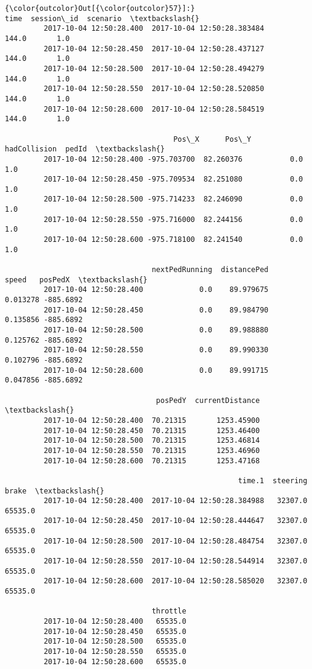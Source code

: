 \documentclass[11pt]{article}
\begin{document}
\begin{Verbatim}[commandchars=\\\{\}]
{\color{outcolor}Out[{\color{outcolor}57}]:}                                                time  session\_id  scenario  \textbackslash{}
         2017-10-04 12:50:28.400  2017-10-04 12:50:28.383484       144.0       1.0   
         2017-10-04 12:50:28.450  2017-10-04 12:50:28.437127       144.0       1.0   
         2017-10-04 12:50:28.500  2017-10-04 12:50:28.494279       144.0       1.0   
         2017-10-04 12:50:28.550  2017-10-04 12:50:28.520850       144.0       1.0   
         2017-10-04 12:50:28.600  2017-10-04 12:50:28.584519       144.0       1.0   
         
                                       Pos\_X      Pos\_Y  hadCollision  pedId  \textbackslash{}
         2017-10-04 12:50:28.400 -975.703700  82.260376           0.0    1.0   
         2017-10-04 12:50:28.450 -975.709534  82.251080           0.0    1.0   
         2017-10-04 12:50:28.500 -975.714233  82.246090           0.0    1.0   
         2017-10-04 12:50:28.550 -975.716000  82.244156           0.0    1.0   
         2017-10-04 12:50:28.600 -975.718100  82.241540           0.0    1.0   
         
                                  nextPedRunning  distancePed     speed   posPedX  \textbackslash{}
         2017-10-04 12:50:28.400             0.0    89.979675  0.013278 -885.6892   
         2017-10-04 12:50:28.450             0.0    89.984790  0.135856 -885.6892   
         2017-10-04 12:50:28.500             0.0    89.988880  0.125762 -885.6892   
         2017-10-04 12:50:28.550             0.0    89.990330  0.102796 -885.6892   
         2017-10-04 12:50:28.600             0.0    89.991715  0.047856 -885.6892   
         
                                   posPedY  currentDistance  \textbackslash{}
         2017-10-04 12:50:28.400  70.21315       1253.45900   
         2017-10-04 12:50:28.450  70.21315       1253.46400   
         2017-10-04 12:50:28.500  70.21315       1253.46814   
         2017-10-04 12:50:28.550  70.21315       1253.46960   
         2017-10-04 12:50:28.600  70.21315       1253.47168   
         
                                                      time.1  steering    brake  \textbackslash{}
         2017-10-04 12:50:28.400  2017-10-04 12:50:28.384988   32307.0  65535.0   
         2017-10-04 12:50:28.450  2017-10-04 12:50:28.444647   32307.0  65535.0   
         2017-10-04 12:50:28.500  2017-10-04 12:50:28.484754   32307.0  65535.0   
         2017-10-04 12:50:28.550  2017-10-04 12:50:28.544914   32307.0  65535.0   
         2017-10-04 12:50:28.600  2017-10-04 12:50:28.585020   32307.0  65535.0   
         
                                  throttle  
         2017-10-04 12:50:28.400   65535.0  
         2017-10-04 12:50:28.450   65535.0  
         2017-10-04 12:50:28.500   65535.0  
         2017-10-04 12:50:28.550   65535.0  
         2017-10-04 12:50:28.600   65535.0  
\end{Verbatim}
            
\end{document}

